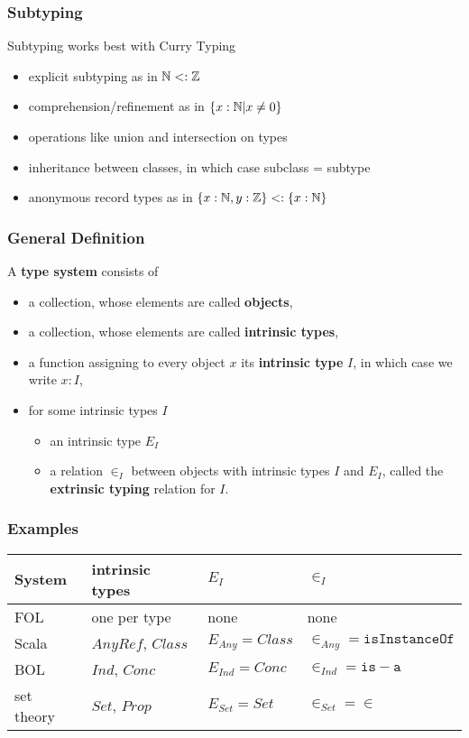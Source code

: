 \documentclass{beamer}
\begin{document}
\begin{frame}\frametitle{Subtyping}
Subtyping works best with Curry Typing
\begin{itemize}
 \item explicit subtyping as in $\mathbb{N}<:\mathbb{Z}$
 \item comprehension/refinement as in $\{x:\mathbb{N}|x\neq 0\}$
 \item operations like union and intersection on types
 \item inheritance between classes, in which case subclass = subtype
 \item anonymous record types as in $\{x:\mathbb{N},y:\mathbb{Z}\}<:\{x:\mathbb{N}\}$
\end{itemize}
\end{frame}

\begin{frame}\frametitle{General Definition}
A \textbf{type system} consists of
\begin{itemize}
 \item a collection, whose elements are called \textbf{objects},
 \item a collection, whose elements are called \textbf{intrinsic types},
 \item a function assigning to every object $x$ its \textbf{intrinsic type} $I$, in which case we write $x:I$,
 \item for some intrinsic types $I$
  \begin{itemize}
   \item an intrinsic type $E_I$
   \item a relation $\in_I$ between objects with intrinsic types $I$ and $E_I$, called the \textbf{extrinsic typing} relation for $I$.
  \end{itemize}
\end{itemize}
\end{frame}

\begin{frame}\frametitle{Examples}
\begin{center}
\begin{tabular}{l|lll}
System & intrinsic types & $E_I$ & $\in_I$ \\
\hline
FOL & one per type & none & none \\
Scala & $AnyRef$, $Class$ & $E_{Any}=Class$ & $\in_{Any}=\mathtt{isInstanceOf}$\\ 
BOL & $Ind$, $Conc$ & $E_{Ind}=Conc$ & $\in_{Ind}=\mathtt{is-a}$\\
set theory & $Set$, $Prop$ & $E_{Set}=Set$ & $\in_{Set}=\in$ \\
\end{tabular}
\end{center}
\end{frame}
\end{document}
